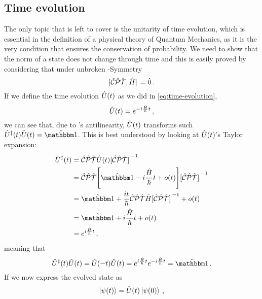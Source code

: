         \subsection{Time evolution}
            The only topic that is left to cover is the unitarity of time evolution, which is essential in the definition of a physical theory of Quantum Mechanics, as it is the very condition that ensures the conservation of probability. We need to show that the norm of a state does not change through time and this is easily proved by considering that under unbroken \PT-Symmetry
            \begin{equation}
                \comm*{\hCPT}{\hH} = \hzero
                \myperiod
            \end{equation}
            If we define the time evolution $\hU\pqty{t}$ as we did in \eqref{eq:time-evolution},
            \begin{equation*}
                \hU\pqty{t} = \myexp{-i\frac{\hH}{\hbar}t}
                \mycomma
            \end{equation*}
            we can see that, due to \hPT's antilinearity, $\hU\pqty{t}$ transforms such $\hU^\myconj\pqty{t} \hU\pqty{t} = \hidM$. This is best understood by looking at $\hU\pqty{t}$'s Taylor expansion:
            \begin{align*}
                \hU^\myconj\pqty{t}
                &= \CPTtransform{\hU\pqty{t}} \\
                &= \CPTtransform{\bqty{\hidM - i\frac{\hH}{\hbar}t + o\pqty{t}}} \\
                &= \hidM + \frac{it}{\hbar}\CPTtransform{\hH} + o\pqty{t}\\
                &= \hidM + i\frac{\hH}{\hbar}t + o\pqty{t}\\
                &= \myexp{i\frac{\hH}{\hbar}t}
                \mycomma
            \end{align*}
            meaning that
            \begin{equation*}
                \hU^\myconj\pqty{t} \hU\pqty{t}
                = \hU\pqty{-t} \hU\pqty{t}
                = \myexp{i\frac{\hH}{\hbar}t} \myexp{-i\frac{\hH}{\hbar}t}
                = \hidM
                \myperiod
            \end{equation*}
            If we now express the evolved state as
            \begin{equation*}
                \ket{\psi\pqty{t}} = \hU\pqty{t}\ket{\psi\pqty{0}}
                \mycomma
            \end{equation*}
